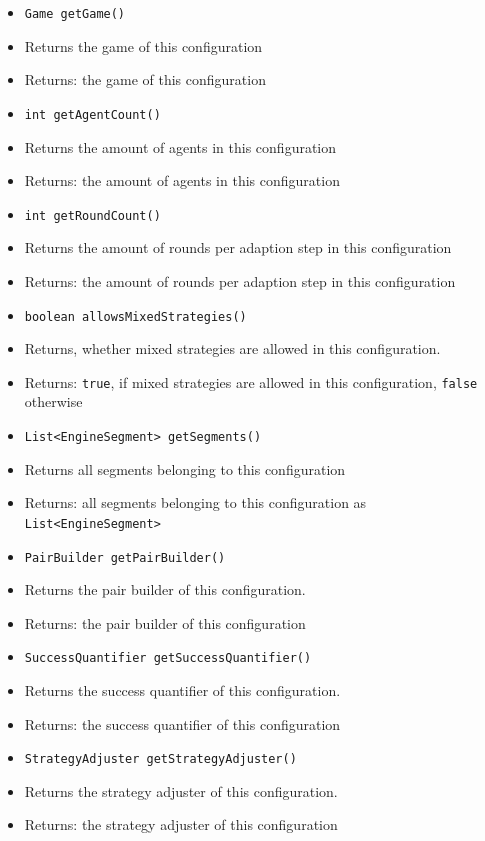 \documentclass[parskip=full,11pt]{scrartcl}
\begin{document}
\begin{itemize}\itemsep -10pt
\item \texttt{Game getGame()}
\item[] Returns the game of this configuration
\item[] Returns: the game of this configuration

\item \texttt{int getAgentCount()}
\item[] Returns the amount of agents in this configuration
\item[] Returns: the amount of agents in this configuration

\item \texttt{int getRoundCount()}
\item[] Returns the amount of rounds per adaption step in this configuration
\item[] Returns: the amount of rounds per adaption step in this configuration

\item \texttt{boolean allowsMixedStrategies()}
\item[] Returns, whether mixed strategies are allowed in this configuration.
\item[] Returns: \texttt{true}, if mixed strategies are allowed in this configuration, \texttt{false} otherwise

\item \texttt{List<EngineSegment> getSegments()}
\item[] Returns all segments belonging to this configuration
\item[] Returns: all segments belonging to this configuration as \texttt{List<EngineSegment>}

\item \texttt{PairBuilder getPairBuilder()}
\item[] Returns the pair builder of this configuration.
\item[] Returns: the pair builder of this configuration

\item \texttt{SuccessQuantifier getSuccessQuantifier()}
\item[] Returns the success quantifier of this configuration.
\item[] Returns: the success quantifier of this configuration

\item \texttt{StrategyAdjuster getStrategyAdjuster()}
\item[] Returns the strategy adjuster of this configuration.
\item[] Returns: the strategy adjuster of this configuration


\end{itemize}
\end{document}
